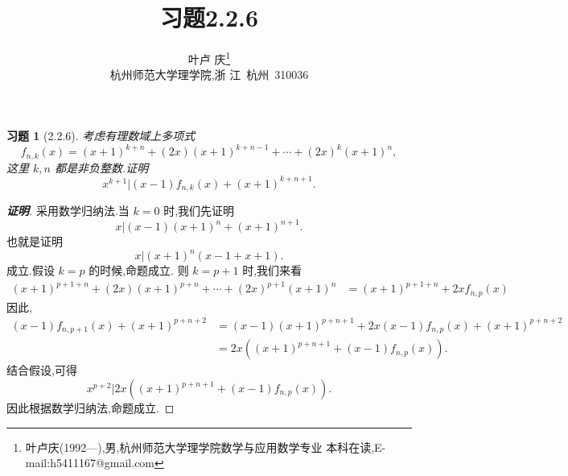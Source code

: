 \documentclass[twoside,11pt]{article}
\newtheorem*{exercise}{习题}
\begin{document}
\title{\huge{\bf{习题2.2.6}}} \author{\small{叶卢
    庆\footnote{叶卢庆(1992---),男,杭州师范大学理学院数学与应用数学专业
      本科在读,E-mail:h5411167@gmail.com}}\\{\small{杭州师范大学理学院,浙
      江~杭州~310036}}} \date{}
\maketitle





\vspace{30pt} %
\begin{exercise}[2.2.6]
考虑有理数域上多项式
$$
f_{n,k}(x)=(x+1)^{k+n}+(2x)(x+1)^{k+n-1}+\cdots+(2x)^k(x+1)^n,
$$
这里 $k,n$ 都是非负整数.证明
$$
x^{k+1}|(x-1)f_{n,k}(x)+(x+1)^{k+n+1}.
$$
\end{exercise}
\begin{proof}[\textbf{证明}]
采用数学归纳法.当 $k=0$ 时,我们先证明
$$
x|(x-1) (x+1)^n+(x+1)^{n+1}.
$$
也就是证明
$$
x|(x+1)^n(x-1+x+1).
$$
成立.假设 $k=p$ 的时候,命题成立.
则 $k=p+1$ 时,我们来看
\begin{align*}
  (x+1)^{p+1+n}+(2x)(x+1)^{p+n}+\cdots+(2x)^{p+1}(x+1)^n&=(x+1)^{p+1+n}+2xf_{n,p}(x)
\end{align*}
因此,
\begin{align*}
  (x-1)f_{n,p+1}(x)+(x+1)^{p+n+2}&=(x-1)(x+1)^{p+n+1}+2x(x-1)f_{n,p}(x)+(x+1)^{p+n+2}\\&=2x((x+1)^{p+n+1}+(x-1)f_{n,p}(x)).
\end{align*}
结合假设,可得
$$
x^{p+2}|2x((x+1)^{p+n+1}+(x-1)f_{n,p}(x)).
$$
因此根据数学归纳法,命题成立.
\end{proof}

% 
\end{document}
